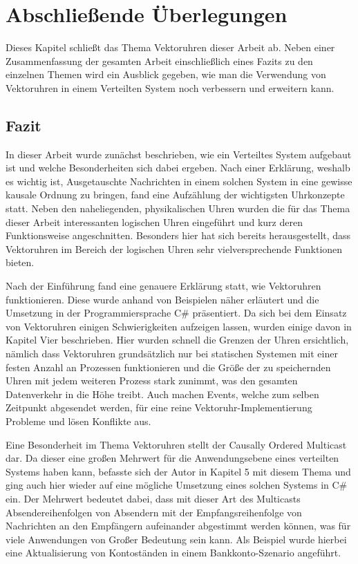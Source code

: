 \section{Abschließende Überlegungen}
\label{cap:schluss}
Dieses Kapitel schließt das Thema Vektoruhren dieser Arbeit ab. Neben einer Zusammenfassung der gesamten Arbeit einschließlich eines Fazits zu den einzelnen Themen wird ein Ausblick gegeben, wie man die Verwendung von Vektoruhren in einem Verteilten System noch verbessern und erweitern kann.
\subsection{Fazit}
In dieser Arbeit wurde zunächst beschrieben, wie ein Verteiltes System aufgebaut ist und welche Besonderheiten sich dabei ergeben. Nach einer Erklärung, weshalb es wichtig ist, Ausgetauschte Nachrichten in einem solchen System in eine gewisse kausale Ordnung zu bringen, fand eine Aufzählung der wichtigsten Uhrkonzepte statt. Neben den naheliegenden, physikalischen Uhren wurden die für das Thema dieser Arbeit interessanten logischen Uhren eingeführt und kurz deren Funktionsweise angeschnitten. Besonders hier hat sich bereits herausgestellt, dass Vektoruhren im Bereich der logischen Uhren sehr vielversprechende Funktionen bieten.

Nach der Einführung fand eine genauere Erklärung statt, wie Vektoruhren funktionieren. Diese wurde anhand von Beispielen näher erläutert und die Umsetzung in der Programmiersprache C\# präsentiert. Da sich bei dem Einsatz von Vektoruhren einigen Schwierigkeiten aufzeigen lassen, wurden einige davon in Kapitel Vier beschrieben. Hier wurden schnell die Grenzen der Uhren ersichtlich, nämlich dass Vektoruhren grundsätzlich nur bei statischen Systemen mit einer festen Anzahl an Prozessen funktionieren und die Größe der zu speichernden Uhren mit jedem weiteren Prozess stark zunimmt, was den gesamten Datenverkehr in die Höhe treibt. Auch machen Events, welche zum selben Zeitpunkt abgesendet werden, für eine reine Vektoruhr-Implementierung Probleme und lösen Konflikte aus.

Eine Besonderheit im Thema Vektoruhren stellt der Causally Ordered Multicast dar. Da dieser eine großen Mehrwert für die Anwendungsebene eines verteilten Systems haben kann, befasste sich der Autor in Kapitel 5 mit diesem Thema und ging auch hier wieder auf eine mögliche Umsetzung eines solchen Systems in C\# ein. Der Mehrwert bedeutet dabei, dass mit dieser Art des Multicasts Absendereihenfolgen von Absendern mit der Empfangsreihenfolge von Nachrichten an den Empfängern aufeinander abgestimmt werden können, was für viele Anwendungen von Großer Bedeutung sein kann. Als Beispiel wurde hierbei eine Aktualisierung von Kontoständen in einem Bankkonto-Szenario angeführt.

